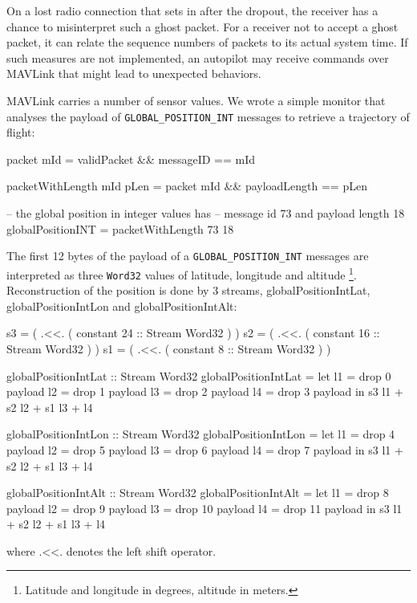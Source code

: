 On a lost radio connection that sets in after the dropout, the receiver has a
chance to misinterpret such a ghost packet.  For a receiver not to accept a
ghost packet, it can relate the sequence numbers of packets to its actual system
time. If such measures are not implemented, an autopilot may receive commands
over MAVLink that might lead to unexpected behaviors.

MAVLink carries a number of sensor values. We wrote a simple monitor that
analyses the payload of {\tt GLOBAL\_POSITION\_INT} messages to retrieve a
trajectory of flight:

\begin{code}
packet mId = validPacket && messageID == mId

packetWithLength mId pLen = packet mId
                          && payloadLength == pLen

-- the global position in integer values has 
-- message id 73  and payload length 18
globalPositionINT = packetWithLength 73 18
\end{code}

The first 12 bytes of the payload of a {\small \tt GLOBAL\_POSITION\_INT}
messages are interpreted as three {\tt Word32} values of latitude, longitude and
altitude
\footnote{Latitude and longitude in degrees, altitude in meters.}.
Reconstruction of the position is done by 3 streams, globalPositionIntLat,
globalPositionIntLon and globalPositionIntAlt:

\begin{code}
s3 = ( .<<. ( constant 24 :: Stream Word32 ) )
s2 = ( .<<. ( constant 16 :: Stream Word32 ) )
s1 = ( .<<. ( constant 8  :: Stream Word32 ) )

globalPositionIntLat :: Stream Word32
globalPositionIntLat = let l1 = drop 0 payload
                           l2 = drop 1 payload
                           l3 = drop 2 payload
                           l4 = drop 3 payload
                       in s3 l1 + s2 l2 + s1 l3 + l4

globalPositionIntLon :: Stream Word32
globalPositionIntLon = let l1 = drop 4 payload
                           l2 = drop 5 payload
                           l3 = drop 6 payload
                           l4 = drop 7 payload
                       in s3 l1 + s2 l2 + s1 l3 + l4

globalPositionIntAlt :: Stream Word32
globalPositionIntAlt = let l1 = drop 8  payload
                           l2 = drop 9  payload
                           l3 = drop 10 payload
                           l4 = drop 11 payload
                       in s3 l1 + s2 l2 + s1 l3 + l4
\end{code}
where $\texttt{.<<.}$ denotes the left shift operator. 

